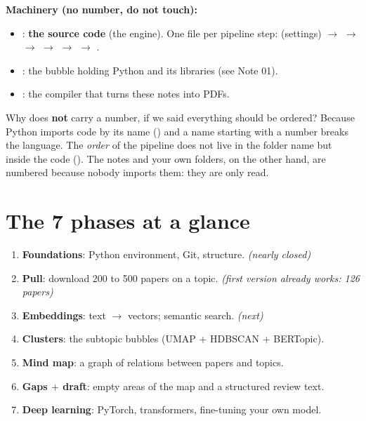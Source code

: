 \documentclass[11pt,a4paper]{article}
\begin{document}
\textbf{Machinery (no number, do not touch):}
\begin{itemize}
  \item {}: \textbf{the source code} (the engine). One file per pipeline step:
         (settings) $\rightarrow$  $\rightarrow$
         $\rightarrow$  $\rightarrow$ 
        $\rightarrow$  $\rightarrow$ .
  \item {}: the bubble holding Python and its libraries (see Note 01).
  \item {}: the compiler that turns these notes into PDFs.
\end{itemize}

\begin{ojo}
Why does  \textbf{not} carry a number, if we said everything should be
ordered? Because Python imports code by its name () and a
name starting with a number breaks the language. The \emph{order} of the pipeline does not
live in the folder name but inside the code (). The notes
and your own folders, on the other hand, are numbered because nobody imports them: they
are only read.
\end{ojo}

\section{The 7 phases at a glance}

\begin{enumerate}
  \item[\textbf{F0}] \textbf{Foundations}: Python environment, Git, structure. \emph{(nearly closed)}
  \item[\textbf{F1}] \textbf{Pull}: download 200 to 500 papers on a topic. \emph{(first version already works: 126 papers)}
  \item[\textbf{F2}] \textbf{Embeddings}: text $\rightarrow$ vectors; semantic search. \emph{(next)}
  \item[\textbf{F3}] \textbf{Clusters}: the subtopic bubbles (UMAP $+$ HDBSCAN $+$ BERTopic).
  \item[\textbf{F4}] \textbf{Mind map}: a graph of relations between papers and topics.
  \item[\textbf{F5}] \textbf{Gaps $+$ draft}: empty areas of the map and a structured review text.
  \item[\textbf{F6}] \textbf{Deep learning}: PyTorch, transformers, fine-tuning your own model.
\end{enumerate}
\end{document}

